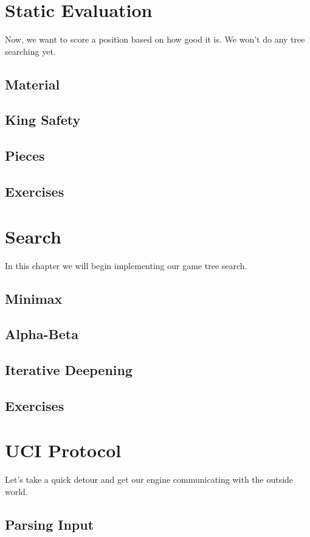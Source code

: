 \documentclass[letterpaper,11pt]{article}
\begin{document}
\section{Static Evaluation}

Now, we want to score a position based on how good it is. We won't do any tree searching yet.

\subsection{Material}
\subsection{King Safety}
\subsection{Pieces}
\subsection{Exercises}

\section{Search}

In this chapter we will begin implementing our game tree search.

\subsection{Minimax}
\subsection{Alpha-Beta}
\subsection{Iterative Deepening}
\subsection{Exercises}

\section{UCI Protocol}

Let's take a quick detour and get our engine communicating with the outside world.

\subsection{Parsing Input}
\end{document}
